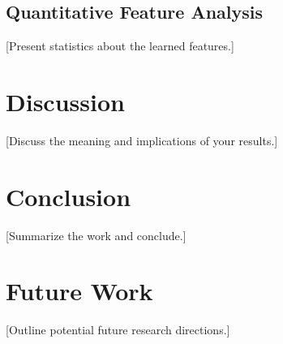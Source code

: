 \documentclass{article}
\begin{document}

\subsection{Quantitative Feature Analysis}
[Present statistics about the learned features.]

\section{Discussion}
\label{sec:discussion}

[Discuss the meaning and implications of your results.]

\section{Conclusion}
\label{sec:conclusion}

[Summarize the work and conclude.]

\section{Future Work}

[Outline potential future research directions.]
\end{document}
